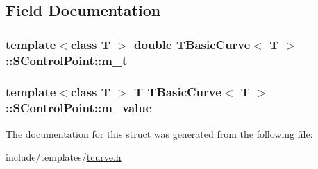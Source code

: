 \subsection{Field Documentation}
\hypertarget{structTBasicCurve_1_1SControlPoint_addc65fabea5333b97fd43822a690caf7}{
\subsubsection[{m\_\-t}]{\setlength{\rightskip}{0pt plus 5cm}template$<$class T $>$ double {\bf TBasicCurve}$<$ T $>$::{\bf SControlPoint::m\_\-t}}}
\label{structTBasicCurve_1_1SControlPoint_addc65fabea5333b97fd43822a690caf7}
\hypertarget{structTBasicCurve_1_1SControlPoint_a43554a3e5ce6ec6c57abb9a17ca25cee}{
\subsubsection[{m\_\-value}]{\setlength{\rightskip}{0pt plus 5cm}template$<$class T $>$ T {\bf TBasicCurve}$<$ T $>$::{\bf SControlPoint::m\_\-value}}}
\label{structTBasicCurve_1_1SControlPoint_a43554a3e5ce6ec6c57abb9a17ca25cee}


The documentation for this struct was generated from the following file:\begin{DoxyCompactItemize}
\item 
include/templates/\hyperlink{tcurve_8h}{tcurve.h}\end{DoxyCompactItemize}
